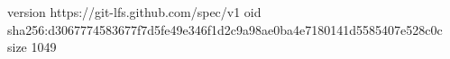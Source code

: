 version https://git-lfs.github.com/spec/v1
oid sha256:d3067774583677f7d5fe49e346f1d2c9a98ae0ba4e7180141d5585407e528c0c
size 1049
